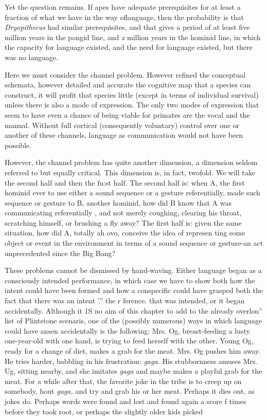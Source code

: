 Yet the question remains. If apes have adequate prerequisites for at least a fraction of what we have in the way oflanguage, then the probability is that \textit{Dryopithecus} had similar prerequisites, and that gives a period of at least five million years in the pongid line, and \textit{x} million years in the hominid line, in which the capacity for language existed, and the need for language existed, but there was no language.

Here we must consider the channel problem. However refined the conceptual schemata, however detailed and accurate the cognitive map that a species can construct, it will profit that species little (except in terms of individual survival) unless there is also a mode of expression. The only two modes of expression that seem to have even a chance of being viable for primates are the vocal and the manual. Without full cortical (consequently voluntary) control over one or another of these channels, language as communication would not have been possible.

However, the channel problem has quite another dimension, a dimension seldom referred to but equally critical. This dimension is, in fact, twofold. We will take the second half and then the fu:st half. The second half is: when A, the first hominid ever to use either a sound sequence or a gesture referentially, made such sequence or gesture to B, another hominid, how did B know that A was communicating referenti\-ally , and not merely coughing, clearing his throat, scratching himself, or brushing a fly away? The first half is: given the same situation, how did A, totally ah ovo, conceive the idea of represen ting some object or event in the environment in terms of a sound sequence or gesture-an act unprecedented since the Big Bang?


These problems cannot be dismissed by hand-waving. Either language began as a consciously intended performance, in which case we have to show both how the intent could have been formed and how a conspecific could have grasped both the fact that there was an intent '.{\textquotedbl}'' the r ference. that was intended, or it began accidentally. Although it 1S no aim of this chapter to add to the already overlon'' list of Plint\-stone scenaris, one of the (possibly numerous) ways in which language could have ansen accidentally is the following: Mrs. Og, breast-feeding a lusty one-year-old with one hand, is trying to feed herself with the other. Young Og, ready for a change of diet, makes a grab for the meat. Mrs. Og pushes him away. He tries harder, babbling in his frustra\-tion: \textit{gaga.} His stubbornness amuses Mrs. Ug, sitting nearby, and she imitates \textit{gaga} and maybe makes a playful grab for the meat. For a while after that, the favorite joke in the tribe is to creep up on somebody, hout \textit{gaga, }and try and grab his or her meat. Perhaps it dies out, as jokes do. Perhaps words were found and lost and found again a score f times before they took root, or perhaps the slightly older kids picked

